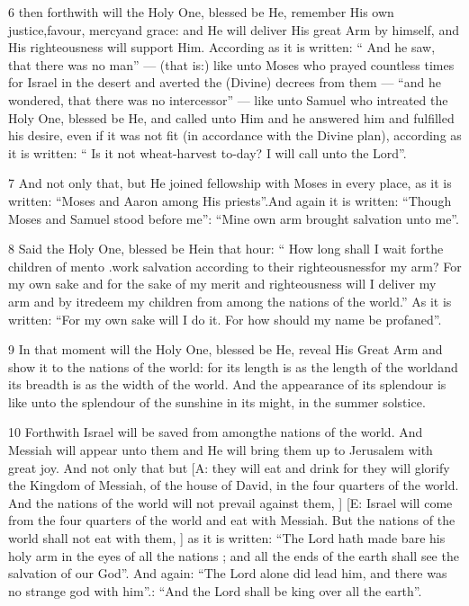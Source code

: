 \par 6 then forthwith will the Holy One, blessed be He, remember His own justice,favour, mercyand grace: and He will deliver His great Arm by himself, and His righteousness will support Him. According as it is written: “ And he saw, that there was no man” — (that is:) like unto Moses who prayed countless times for Israel in the desert and averted the (Divine) decrees from them — “and he wondered, that there was no intercessor” — like unto Samuel who intreated the Holy One, blessed be He, and called unto Him and he answered him and fulfilled his desire, even if it was not fit (in accordance with the Divine plan), according as it is written: “ Is it not wheat-harvest to-day? I will call unto the Lord”. 

\par 7 And not only that, but He joined fellowship with Moses in every place, as it is written: “Moses and Aaron among His priests”.And again it is written: “Though Moses and Samuel stood before me”: “Mine own arm brought salvation unto me”. 

\par 8 Said the Holy One, blessed be Hein that hour: “ How long shall I wait forthe children of mento .work salvation according to their righteousnessfor my arm? For my own sake and for the sake of my merit and righteousness will I deliver my arm and by itredeem my children from among the nations of the world.” As it is written: “For my own sake will I do it. For how should my name be profaned”. 

\par 9 In that moment will the Holy One, blessed be He, reveal His Great Arm and show it to the nations of the world: for its length is as the length of the worldand its breadth is as the width of the world. And the appearance of its splendour is like unto the splendour of the sunshine in its might, in the summer solstice. 

\par 10 Forthwith Israel will be saved from amongthe nations of the world. And Messiah will appear unto them and He will bring them up to Jerusalem with great joy. And not only that but [A: they will eat and drink for they will glorify the Kingdom of Messiah, of the house of David, in the four quarters of the world. And the nations of the world will not prevail against them, ] [E: Israel will come from the four quarters of the world and eat with Messiah. But the nations of the world shall not eat with them, ] as it is written: “The Lord hath made bare his holy arm in the eyes of all the nations ; and all the ends of the earth shall see the salvation of our God”. And again: “The Lord alone did lead him, and there was no strange god with him”.: “And the Lord shall be king over all the earth”. 



